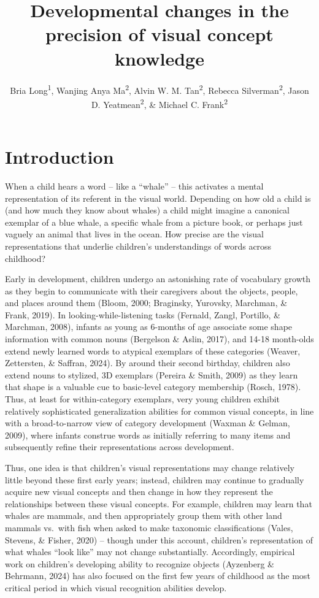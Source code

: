 \documentclass[
  man,mask]{apa6}
\title{Developmental changes in the precision of visual concept knowledge}
\author{Bria Long\textsuperscript{1}, Wanjing Anya Ma\textsuperscript{2}, Alvin W. M. Tan\textsuperscript{2}, Rebecca Silverman\textsuperscript{2}, Jason D. Yeatmean\textsuperscript{2}, \& Michael C. Frank\textsuperscript{2}}
\date{}
\affiliation{\vspace{0.5cm}\textsuperscript{1} University of California San Diego\\\textsuperscript{2} Stanford University}
\begin{document}
\maketitle

\section{Introduction}\label{introduction}

When a child hears a word -- like a ``whale'' -- this activates a mental representation of its referent in the visual world. Depending on how old a child is (and how much they know about whales) a child might imagine a canonical exemplar of a blue whale, a specific whale from a picture book, or perhaps just vaguely an animal that lives in the ocean. How precise are the visual representations that underlie children's understandings of words across childhood?

Early in development, children undergo an astonishing rate of vocabulary growth as they begin to communicate with their caregivers about the objects, people, and places around them (Bloom, 2000; Braginsky, Yurovsky, Marchman, \& Frank, 2019). In looking-while-listening tasks (Fernald, Zangl, Portillo, \& Marchman, 2008), infants as young as 6-months of age associate some shape information with common nouns (Bergelson \& Aslin, 2017), and 14-18 month-olds extend newly learned words to atypical exemplars of these categories (Weaver, Zettersten, \& Saffran, 2024). By around their second birthday, children also extend nouns to stylized, 3D exemplars (Pereira \& Smith, 2009) as they learn that shape is a valuable cue to basic-level category membership (Rosch, 1978). Thus, at least for within-category exemplars, very young children exhibit relatively sophisticated generalization abilities for common visual concepts, in line with a broad-to-narrow view of category development (Waxman \& Gelman, 2009), where infants construe words as initially referring to many items and subsequently refine their representations across development.

Thus, one idea is that children's visual representations may change relatively little beyond these first early years; instead, children may continue to gradually acquire new visual concepts and then change in how they represent the relationships between these visual concepts. For example, children may learn that whales are mammals, and then appropriately group them with other land mammals vs.~with fish when asked to make taxonomic classifications (Vales, Stevens, \& Fisher, 2020) -- though under this account, children's
representation of what whales ``look like'' may not change substantially. Accordingly, empirical work on children's developing ability to recognize objects (Ayzenberg \& Behrmann, 2024) has also focused on the first few years of childhood as the most critical period in which visual recognition abilities develop.
\end{document}
